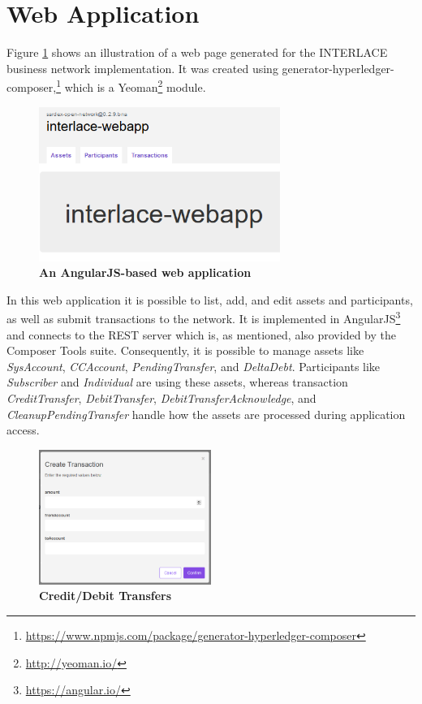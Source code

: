 \section{Web Application}
\label{sec:webapp}

Figure \ref{fig:webapp} shows an illustration of a web page generated for the INTERLACE business network implementation. It was  created using generator-hyperledger-composer,\footnote{\url{https://www.npmjs.com/package/generator-hyperledger-composer}} which is a Yeoman\footnote{\url{http://yeoman.io/}} module.

\begin{figure}[htbp]
  \centering
  \includegraphics[width=0.7\textwidth]{Figures/webapp}
  \caption{\bf\small An AngularJS-based web application }
  \label{fig:webapp}
\end{figure}

In this web application it is possible to list, add, and edit assets and participants, as well as submit transactions to the network. It is implemented in AngularJS\footnote{\url{https://angular.io/}} and connects to the REST server which is, as mentioned, also provided by the Composer Tools suite. Consequently, it is possible to manage assets like \textit{SysAccount}, \textit{CCAccount}, \textit{PendingTransfer}, and \textit{DeltaDebt}. Participants like \textit{Subscriber} and \textit{Individual} are using these assets, whereas transaction \textit{CreditTransfer}, \textit{DebitTransfer}, \textit{DebitTransferAcknowledge}, and \textit{CleanupPendingTransfer} handle how the assets are processed during application access.

\begin{figure}[htbp]
  \centering
  \includegraphics[width=0.5\textwidth]{Figures/webapp-transfer}
  \caption{\bf\small Credit/Debit Transfers }
  \label{fig:webapp-transfer}
\end{figure}

